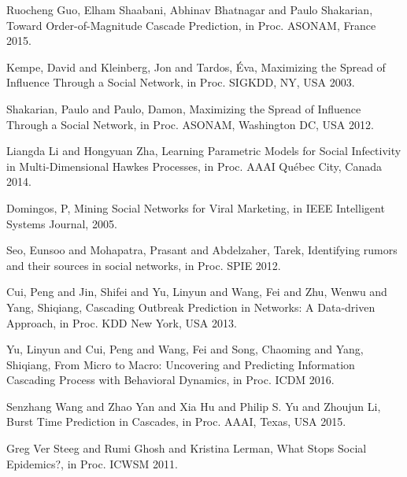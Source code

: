 \documentclass[smallextended]{svjour3}       %
\theoremstyle{definition}
\begin{document}
\begin{thebibliography}{}
%
%
 {Ruocheng Guo,
	Elham Shaabani,
	Abhinav Bhatnagar and
	Paulo Shakarian},
Toward Order-of-Magnitude Cascade Prediction,
in Proc. ASONAM, France
{2015.}

{Kempe, David and Kleinberg, Jon and Tardos, \'{E}va},
Maximizing the Spread of Influence Through a Social Network,
in Proc. SIGKDD, NY, USA
{2003.}

{Shakarian, Paulo and Paulo, Damon},
Maximizing the Spread of Influence Through a Social Network,
in Proc. ASONAM, Washington DC, USA
{2012.}

{Liangda Li and
	Hongyuan Zha},
Learning Parametric Models for Social Infectivity in Multi-Dimensional
Hawkes Processes,
in Proc. AAAI Qu{\'{e}}bec City, Canada
{2014.}

{Domingos, P},
Mining Social Networks for Viral Marketing,
in IEEE Intelligent Systems Journal,
{2005.}

{Seo, Eunsoo and Mohapatra, Prasant and Abdelzaher, Tarek},
Identifying rumors and their sources in social networks,
in Proc. SPIE
{2012.}

{Cui, Peng and Jin, Shifei and Yu, Linyun and Wang, Fei and Zhu, Wenwu and Yang, Shiqiang},
Cascading Outbreak Prediction in Networks: A Data-driven Approach,
in Proc. KDD New York, USA
{2013.}

{Yu, Linyun and Cui, Peng and Wang, Fei and Song, Chaoming and Yang, Shiqiang},
From Micro to Macro: Uncovering and Predicting Information Cascading Process with Behavioral Dynamics,
in Proc. ICDM 
{2016.}

{Senzhang Wang and
	Zhao Yan and
	Xia Hu and
	Philip S. Yu and
	Zhoujun Li},
Burst Time Prediction in Cascades,
in Proc. AAAI, Texas, USA
{2015.}

{Greg Ver Steeg and
	Rumi Ghosh and
	Kristina Lerman},
What Stops Social Epidemics?,
in Proc. ICWSM
{2011.}


\end{thebibliography}
\end{document}
